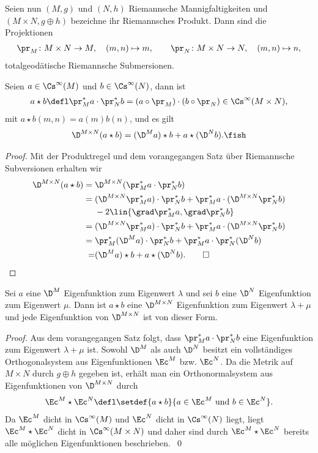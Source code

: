 \documentclass[%
	paper=a5,%
	fleqn,%
	DIV=18,%
	BCOR=0mm,
	fontsize=11pt,
	titlepage=false,%
	bibliography=totoc,
	DIV=18,%
	twoside=true,
	pdftitle=Riemannsche Geometrie,
	pdfauthor=Uwe Semmelmann,
	numbers=noendperiod]%
	{scrbook}
\begin{document}
Seien nun $(M,g)$ und $(N,h)$ Riemannsche Mannigfaltigkeiten und $(M\times N,g\oplus h)$ bezeichne ihr Riemannsches Produkt. Dann sind die Projektionen
\begin{align*}
\pr_{M}\colon M\times N\to M,\quad (m,n)\mapsto m,\qquad
\pr_{N}\colon M\times N\to N,\quad (m,n)\mapsto n,
\end{align*}
totalgeodätische Riemannsche Submersionen. 

\begin{prop}
Seien $a\in\Cs^\infty(M)$ und $b\in\Cs^\infty(N)$, dann ist
\begin{align*}
a\star b\defl
\pr_{M}^*a \cdot \pr_{N}^*b = (a\circ\pr_{M})\cdot (b\circ \pr_{N})\in\Cs^\infty(M\times N),
\end{align*}
mit $a\star b(m,n) = a(m)b(n)$, und es gilt
\begin{align*}
\D^{M\times N}(a\star b) = 
(\D^M a)\star b + 
a\star (\D^N b).\fish
\end{align*}
\end{prop}
\begin{proof}
Mit der Produktregel und dem vorangegangen Satz über Riemannsche Subversionen erhalten wir
\begin{align*}
\D^{M\times N}(a\star b) = { } &
\D^{M\times N}(\pr_{M}^*a \cdot \pr_{N}^*b)\\ = { } & 
(\D^{M\times N}\pr_{M}^*a)\cdot \pr_{N}^*b + 
\pr_{M}^*a\cdot (\D^{M\times N}\pr_{N}^*b)\\
&-2\lin{\grad \pr_{M}^* a ,\grad \pr_{N}^*b}\\
= { } & 
(\D^{M\times N}\pr_{M}^*a)\cdot \pr_{N}^*b + 
\pr_{M}^*a\cdot (\D^{M\times N}\pr_{N}^*b)\\
= { } & 
\pr_{M}^*(\D^Ma)\cdot \pr_{N}^*b
+
\pr_{M}^* a\cdot \pr_{N}^* (\D^N b)\\
{ } = &
(\D^Ma)\star b
+
a\star (\D^N b).\qed
\end{align*}
\end{proof}

\begin{cor}
Sei $a$ eine $\D^M$ Eigenfunktion zum Eigenwert $\lambda$ und sei $b$ eine $\D^N$ Eigenfunktion zum Eigenwert $\mu$. Dann ist $a\star b$ eine $\D^{M\times N}$ Eigenfunktion zum Eigenwert $\lambda+\mu$ und jede Eigenfunktion von $\D^{M\times N}$ ist von dieser Form.\fish
\end{cor}
\begin{proof}
Aus dem vorangegangen Satz folgt, dass $\pr_{M}^* a\cdot \pr_{N}^* b$ eine Eigenfunktion zum Eigenwert $\lambda+\mu$ ist. 
Sowohl $\D^M$ als auch $\D^N$ besitzt ein vollständiges Orthogonalsystem aus Eigenfunktionen $\Ec^M$ bzw. $\Ec^N$.
Da die Metrik auf $M\times N$ durch $g\oplus h$ gegeben ist, erhält man ein Orthonormalsystem aus Eigenfunktionen von $\D^{M\times N}$ durch
\begin{align*}
\Ec^M\star \Ec^N\defl \setdef{a\star b}{a\in \Ec^M\text{ und }b\in\Ec^N}.
\end{align*}
Da $\Ec^M$ dicht in $\Cs^\infty(M)$ und $\Ec^N$ dicht in $\Cs^\infty(N)$ liegt, liegt $\Ec^M\star \Ec^N$ dicht in $\Cs^\infty(M\times N)$ und daher sind durch $\Ec^M\star \Ec^N$ bereits alle möglichen Eigenfunktionen beschrieben.~\qed
\end{proof}
\end{document}
